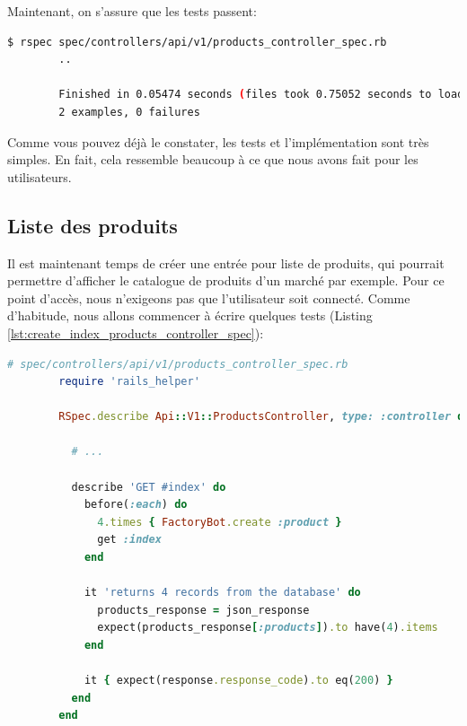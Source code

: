 \documentclass[]{report}
\begin{document}
      Maintenant, on s'assure que les tests passent:

      \begin{scriptsize}
        \begin{lstlisting}[language=bash]
        $ rspec spec/controllers/api/v1/products_controller_spec.rb
        ..

        Finished in 0.05474 seconds (files took 0.75052 seconds to load)
        2 examples, 0 failures
        \end{lstlisting}
      \end{scriptsize}

      Comme vous pouvez déjà le constater, les tests et l'implémentation sont très simples. En fait, cela ressemble beaucoup à ce que nous avons fait pour les utilisateurs.

    \subsection{Liste des produits}

      Il est maintenant temps de créer une entrée pour liste de produits, qui pourrait permettre d'afficher le catalogue de produits d'un marché par exemple. Pour ce point d'accès, nous n'exigeons pas que l'utilisateur soit connecté. Comme d'habitude, nous allons commencer à écrire quelques tests (Listing \ref{lst:create_index_products_controller_spec}):

      \begin{scriptsize}
        \begin{lstlisting}[language=ruby, caption={Test de l'affichage des produits}, label={lst:create_index_products_controller_spec}]
        # spec/controllers/api/v1/products_controller_spec.rb
        require 'rails_helper'

        RSpec.describe Api::V1::ProductsController, type: :controller do

          # ...

          describe 'GET #index' do
            before(:each) do
              4.times { FactoryBot.create :product }
              get :index
            end

            it 'returns 4 records from the database' do
              products_response = json_response
              expect(products_response[:products]).to have(4).items
            end

            it { expect(response.response_code).to eq(200) }
          end
        end
        \end{lstlisting}
      \end{scriptsize}
\end{document}
